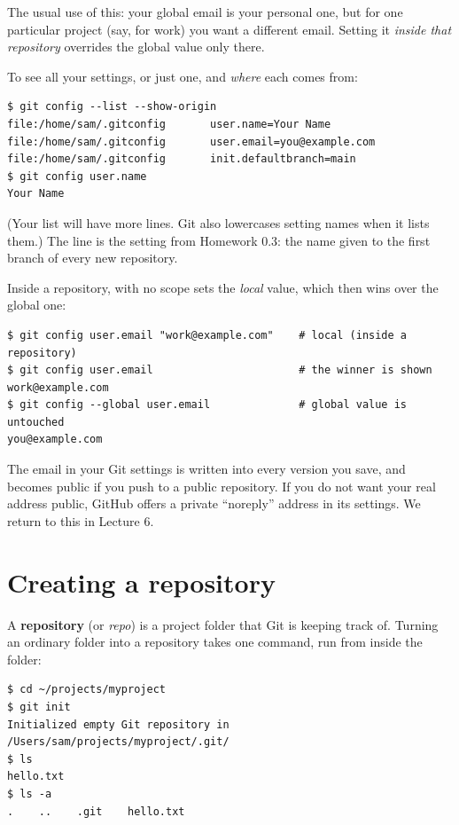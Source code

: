 The usual use of this: your global email is your personal one, but for one particular project (say, for work) you want a different email. Setting it \emph{inside that repository} overrides the global value only there.

To see all your settings, or just one, and \emph{where} each comes from:

\begin{lstlisting}
$ git config --list --show-origin
file:/home/sam/.gitconfig       user.name=Your Name
file:/home/sam/.gitconfig       user.email=you@example.com
file:/home/sam/.gitconfig       init.defaultbranch=main
$ git config user.name
Your Name
\end{lstlisting}
(Your list will have more lines. Git also lowercases setting names when it lists them.) The  line is the setting from Homework 0.3: the name given to the first branch of every new repository.

Inside a repository,  with no scope sets the \emph{local} value, which then wins over the global one:
\begin{lstlisting}
$ git config user.email "work@example.com"    # local (inside a repository)
$ git config user.email                       # the winner is shown
work@example.com
$ git config --global user.email              # global value is untouched
you@example.com
\end{lstlisting}


\begin{pitfall}
The email in your Git settings is written into every version you save, and becomes public if you push to a public repository. If you do not want your real address public, GitHub offers a private ``noreply'' address in its settings. We return to this in Lecture 6.
\end{pitfall}

\section{Creating a repository}

A \textbf{repository} (or \emph{repo}) is a project folder that Git is keeping track of. Turning an ordinary folder into a repository takes one command, run from inside the folder:

\begin{lstlisting}
$ cd ~/projects/myproject
$ git init
Initialized empty Git repository in /Users/sam/projects/myproject/.git/
$ ls
hello.txt
$ ls -a
.    ..    .git    hello.txt
\end{lstlisting}


